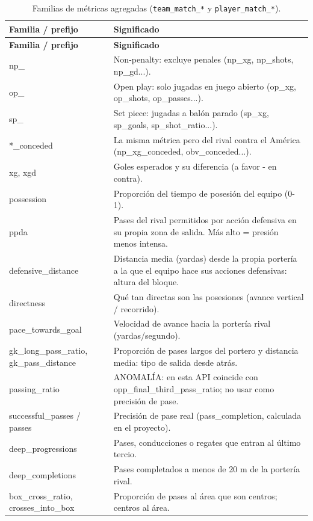 {\scriptsize
\begin{longtable}{p{4.3cm}p{11.2cm}}
\caption{Familias de métricas agregadas (\texttt{team\_match\_*} y \texttt{player\_match\_*}).}\label{tab:dic_familias}\\
\toprule
\textbf{Familia / prefijo} & \textbf{Significado} \\
\midrule
\endfirsthead
\toprule
\textbf{Familia / prefijo} & \textbf{Significado} \\
\midrule
\endhead
\bottomrule
\endfoot
np\_ & Non-penalty: excluye penales (np\_xg, np\_shots, np\_gd...). \\
op\_ & Open play: solo jugadas en juego abierto (op\_xg, op\_shots, op\_passes...). \\
sp\_ & Set piece: jugadas a balón parado (sp\_xg, sp\_goals, sp\_shot\_ratio...). \\
*\_conceded & La misma métrica pero del rival contra el América (np\_xg\_conceded, obv\_conceded...). \\
xg, xgd & Goles esperados y su diferencia (a favor - en contra). \\
possession & Proporción del tiempo de posesión del equipo (0-1). \\
ppda & Pases del rival permitidos por acción defensiva en su propia zona de salida. Más alto = presión menos intensa. \\
defensive\_distance & Distancia media (yardas) desde la propia portería a la que el equipo hace sus acciones defensivas: altura del bloque. \\
directness & Qué tan directas son las posesiones (avance vertical / recorrido). \\
pace\_towards\_goal & Velocidad de avance hacia la portería rival (yardas/segundo). \\
gk\_long\_pass\_ratio, gk\_pass\_distance & Proporción de pases largos del portero y distancia media: tipo de salida desde atrás. \\
passing\_ratio & ANOMALÍA: en esta API coincide con opp\_final\_third\_pass\_ratio; no usar como precisión de pase. \\
successful\_passes / passes & Precisión de pase real (pass\_completion, calculada en el proyecto). \\
deep\_progressions & Pases, conducciones o regates que entran al último tercio. \\
deep\_completions & Pases completados a menos de 20 m de la portería rival. \\
box\_cross\_ratio, crosses\_into\_box & Proporción de pases al área que son centros; centros al área. \\

\end{longtable}}
